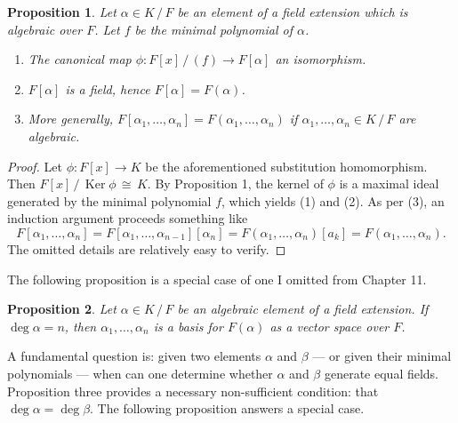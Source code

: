 \documentclass[11pt]{article}
\newtheorem{proposition}{Proposition}
\newcommand{\Ker}{\operatorname{Ker}}
\begin{document}
\begin{adjustwidth}{0.5cm}{}
  \begin{proposition}
    Let $\alpha \in K \, / \, F$ be an element of a field extension which is algebraic over $F$. Let $f$ be the minimal polynomial of $\alpha$.
    \begin{enumerate}
      \item The canonical map $\phi : F[x] \, / \, (f) \to F[\alpha]$ an isomorphism.
      \item $F[\alpha]$ is a field, hence $F[\alpha] = F(\alpha)$.
      \item More generally, $F[\alpha_{1}, \ldots, \alpha_{n}] = F(\alpha_{1}, \ldots, \alpha_{n})$ if $\alpha_{1}, \ldots, \alpha_{n} \in K \, / \, F$ are algebraic.
    \end{enumerate}
  \end{proposition}
  \begin{proof}
    Let $\phi : F[x] \to K$ be the aforementioned substitution homomorphism. Then $F[x] \, / \, \Ker \phi \, \cong \, K$. By Proposition 1, the kernel of $\phi$ is a maximal ideal generated by the minimal polynomial $f$, which yields (1) and (2). As per (3), an induction argument proceeds something like
    \[
      F[\alpha_{1}, \ldots, \alpha_{n}] = F[\alpha_{1}, \ldots, \alpha_{n - 1}][\alpha_{n}] = F(\alpha_{1}, \ldots, \alpha_{n})[a_{k}] = F(\alpha_{1}, \ldots, \alpha_{n}).
    \]
    The omitted details are relatively easy to verify.
  \end{proof}
\end{adjustwidth}

The following proposition is a special case of one I omitted from Chapter 11.

\begin{adjustwidth}{0.5cm}{}
  \begin{proposition}
    Let $\alpha \in K \, / \, F$ be an algebraic element of a field extension. If $\deg \alpha = n$, then $\alpha_{1}, \ldots, \alpha_{n}$ is a basis for $F(\alpha)$ as a vector space over $F$.
  \end{proposition}
\end{adjustwidth}

A fundamental question is: given two elements $\alpha$ and $\beta$ --- or given their minimal polynomials --- when can one determine whether $\alpha$ and $\beta$ generate equal fields. Proposition three provides a necessary non-sufficient condition: that $\deg \alpha = \deg \beta$. The following proposition answers a special case.

\end{document}

